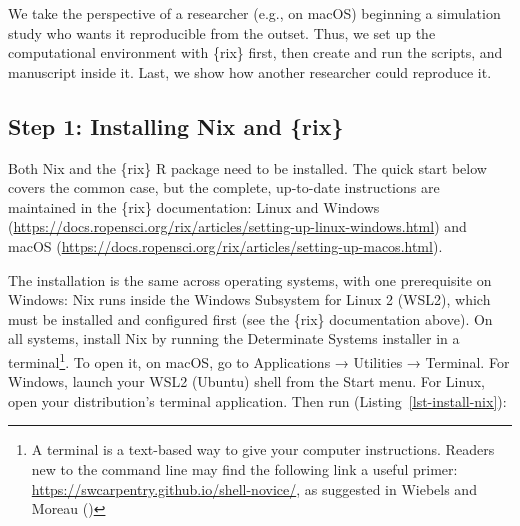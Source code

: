 \documentclass[
  man,
  longtable,
  nolmodern,
  notxfonts,
  notimes,
  colorlinks=true,linkcolor=blue,citecolor=blue,urlcolor=blue]{apa7}
\newenvironment{Shaded}{\begin{snugshade}}{\end{snugshade}}
\newcommand{\AttributeTok}[1]{\textcolor[rgb]{0.40,0.45,0.13}{#1}}
\newcommand{\DataTypeTok}[1]{\textcolor[rgb]{0.68,0.00,0.00}{#1}}
\newcommand{\ExtensionTok}[1]{\textcolor[rgb]{0.00,0.23,0.31}{#1}}
\newcommand{\FunctionTok}[1]{\textcolor[rgb]{0.28,0.35,0.67}{#1}}
\newcommand{\KeywordTok}[1]{\textcolor[rgb]{0.00,0.23,0.31}{\textbf{#1}}}
\newcommand{\NormalTok}[1]{\textcolor[rgb]{0.00,0.23,0.31}{#1}}
\newcommand{\StringTok}[1]{\textcolor[rgb]{0.13,0.47,0.30}{#1}}
\begin{document}
We take the perspective of a researcher (e.g., on macOS) beginning a
simulation study who wants it reproducible from the outset. Thus, we set
up the computational environment with \{rix\} first, then create and run
the scripts, and manuscript inside it. Last, we show how another
researcher could reproduce it.

\subsection{Step 1: Installing Nix and
\{rix\}}\label{step-1-installing-nix-and-rix}

Both Nix and the \{rix\} R package need to be installed. The quick start
below covers the common case, but the complete, up-to-date instructions
are maintained in the \{rix\} documentation: Linux and Windows
(\url{https://docs.ropensci.org/rix/articles/setting-up-linux-windows.html})
and macOS
(\url{https://docs.ropensci.org/rix/articles/setting-up-macos.html}).

The installation is the same across operating systems, with one
prerequisite on Windows: Nix runs inside the Windows Subsystem for Linux
2 (WSL2), which must be installed and configured first (see the \{rix\}
documentation above). On all systems, install Nix by running the
Determinate Systems installer in a terminal\footnote{A terminal is a
  text-based way to give your computer instructions. Readers new to the
  command line may find the following link a useful primer:
  \url{https://swcarpentry.github.io/shell-novice/}, as suggested in
  Wiebels and Moreau ()}. To
open it, on macOS, go to Applications → Utilities → Terminal. For
Windows, launch your WSL2 (Ubuntu) shell from the Start menu. For Linux,
open your distribution's terminal application. Then run
(Listing~\ref{lst-install-nix}):

\begin{codelisting}

\caption{\label{lst-install-nix}Installing Nix \normalsize}

\centering{

\small

\begin{Shaded}
\begin{Highlighting}[]
\ExtensionTok{curl} \AttributeTok{{-}{-}proto} \StringTok{\textquotesingle{}=https\textquotesingle{}} \AttributeTok{{-}{-}tlsv1.2} \AttributeTok{{-}sSf} \DataTypeTok{\textbackslash{}}
  \AttributeTok{{-}L}\NormalTok{ https://install.determinate.systems/nix }\KeywordTok{|} \DataTypeTok{\textbackslash{}}
  \FunctionTok{sh} \AttributeTok{{-}s} \AttributeTok{{-}{-}}\NormalTok{ install}
\end{Highlighting}
\end{Shaded}

}

\end{codelisting}%
\end{document}
